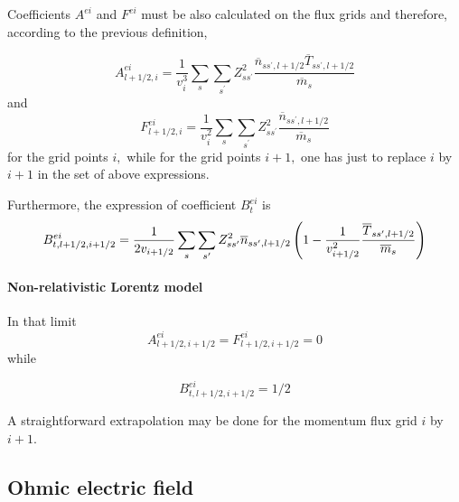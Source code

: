 Coefficients $A^{ei}$ and $F^{ei}$ must be also calculated on the flux grids
and therefore, according to the previous definition,

\begin{equation}
A_{l+1/2,i}^{ei}=\frac{1}{v_{i}^{3}}\sum_{s}\sum_{s^{\prime }}Z_{ss^{\prime
}}^{2}\frac{\overline{n}_{ss^{\prime },l+1/2}\overline{T}_{ss^{\prime
},l+1/2}}{\overline{m}_{s}}
\end{equation}
and
\begin{equation}
F_{l+1/2,i}^{ei}=\frac{1}{v_{i}^{2}}\sum_{s}\sum_{s^{\prime }}Z_{ss^{\prime
}}^{2}\frac{\overline{n}_{ss^{\prime },l+1/2}}{\overline{m}_{s}}
\end{equation}
for the grid points $i,$ while for the grid points $i+1,$ one has just to
replace $i$ by $i+1$ in the set of above expressions.

Furthermore, the expression of coefficient $B_{t}^{ei}$ is
\begin{equation}
B_{t,l+1/2,i+1/2}^{ei}=\frac{1}{2v_{i+1/2}}\sum_{s}\sum_{s^{\prime
}}Z_{ss^{\prime }}^{2}\overline{n}_{ss^{\prime },l+1/2}\left( 1-\frac{1}{%
v_{i+1/2}^{2}}\frac{\overline{T}_{ss^{\prime },l+1/2}}{\overline{m}_{s}}%
\right)
\end{equation}

\paragraph{Non-relativistic Lorentz model}

In that limit
\begin{equation}
A_{l+1/2,i+1/2}^{ei}=F_{l+1/2,i+1/2}^{ei}=0
\end{equation}
while

\begin{equation}
B_{t,l+1/2,i+1/2}^{ei}=1/2
\end{equation}

A straightforward extrapolation may be done for the momentum flux grid $i$
by $i+1.$

\subsection{Ohmic electric field}

